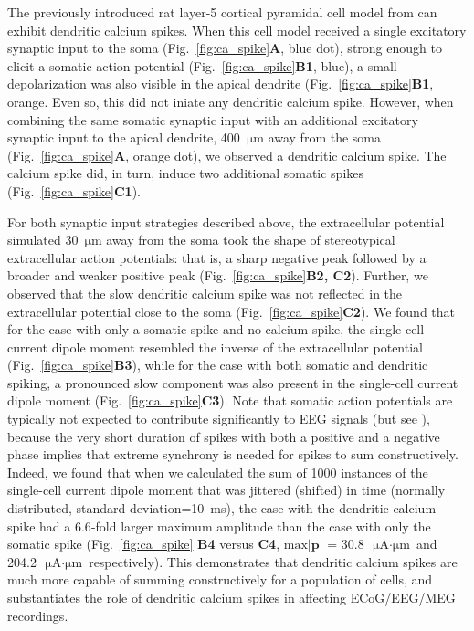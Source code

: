 \documentclass[preprint,10pt,authoryear]{elsarticle}
\newcommand{\hlb}[2][NavyBlue]{ {\sethlcolor{#1} \hl{#2}} }
\newcommand{\hlg}[2][Emerald]{ {\sethlcolor{#1} \hl{#2}} }
\newcommand{\snnote}[1]{\color{white}{\hlb{SN: #1 }}\color{black}}
\newcommand{\tvnnote}[1]{\color{white}{\hlg{TVN: #1 }}\color{black}}
\begin{document}
The previously introduced rat layer-5 cortical pyramidal cell model from \cite{HAY2011} can exhibit dendritic calcium spikes.
When this cell model received a single excitatory synaptic input to the soma (Fig.~\ref{fig:ca_spike}\textbf{A}, blue dot), strong enough to elicit a somatic action potential (Fig.~\ref{fig:ca_spike}\textbf{B1}, blue), a small depolarization was also visible in the apical dendrite (Fig.~\ref{fig:ca_spike}\textbf{B1}, orange. Even so, this did not iniate any dendritic calcium spike. However, when combining the same somatic synaptic input with an additional excitatory synaptic input to the apical dendrite, 400~$\si{\um}$ away from the soma (Fig.~\ref{fig:ca_spike}\textbf{A}, orange dot), we observed a dendritic calcium spike. The calcium spike did, in turn, induce two additional somatic spikes (Fig.~\ref{fig:ca_spike}\textbf{C1}).

For both synaptic input strategies described above, the extracellular potential simulated 30~$\si{\um}$ away from the soma took the shape of stereotypical extracellular action potentials: that is, a sharp negative peak followed by a broader and weaker positive peak (Fig.~\ref{fig:ca_spike}\textbf{B2, C2}). Further, we observed that the slow dendritic calcium spike was not reflected in the extracellular potential close to the soma (Fig.~\ref{fig:ca_spike}\textbf{C2}).
We found that for the case with only a somatic spike and no calcium spike, the single-cell current dipole moment resembled the inverse of the extracellular potential (Fig.~\ref{fig:ca_spike}\textbf{B3}), while for the case with both somatic and dendritic spiking, a pronounced slow component was also present in the single-cell current dipole moment (Fig.~\ref{fig:ca_spike}\textbf{C3}).
Note that somatic action potentials are typically not expected to contribute significantly to EEG signals (but see \cite{TELENCZUK2015}), because the very short duration of spikes with both a positive and a negative phase implies that extreme synchrony is needed for spikes to sum constructively. Indeed, we found that when we calculated the sum of 1000 instances of the single-cell current dipole moment that was jittered (shifted) in time (normally distributed, standard deviation=10~ms), the case with the dendritic calcium spike had a $6.6$-fold larger maximum amplitude than the case with
only the somatic spike (Fig.~\ref{fig:ca_spike} \textbf{B4} versus \textbf{C4}, 
$\mathrm{max}|\mathbf{p}$| = 30.8~$\si{\uA}\cdot\si{\um}$ and 204.2~$\si{\uA}\cdot\si{\um}$ respectively).
This demonstrates that dendritic calcium spikes are much more capable of summing constructively for a population of cells, and substantiates the role of dendritic calcium spikes in affecting ECoG/EEG/MEG recordings. 
\end{document}
